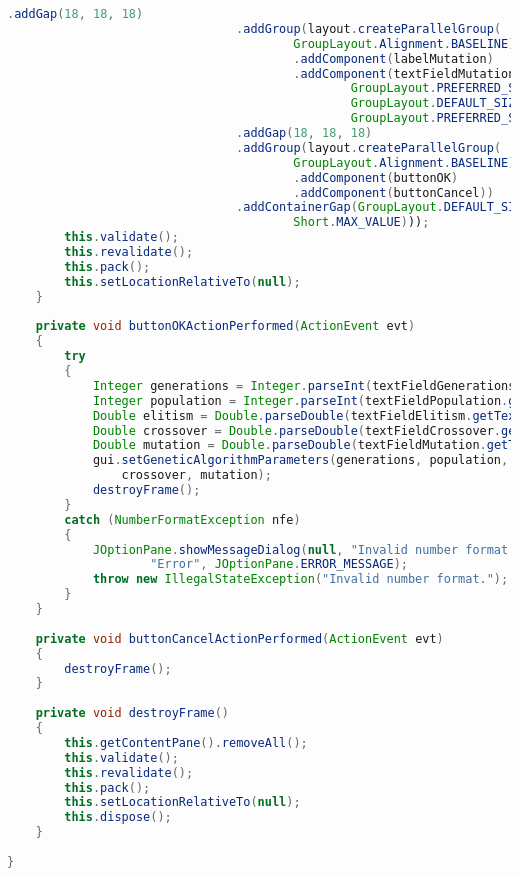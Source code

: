 \begin{lstlisting}[language=Java,basicstyle=\tiny,caption=GeneticParameters.java]
                                .addGap(18, 18, 18)
                                .addGroup(layout.createParallelGroup(
                                        GroupLayout.Alignment.BASELINE)
                                        .addComponent(labelMutation)
                                        .addComponent(textFieldMutation,
                                                GroupLayout.PREFERRED_SIZE,
                                                GroupLayout.DEFAULT_SIZE,
                                                GroupLayout.PREFERRED_SIZE))
                                .addGap(18, 18, 18)
                                .addGroup(layout.createParallelGroup(
                                        GroupLayout.Alignment.BASELINE)
                                        .addComponent(buttonOK)
                                        .addComponent(buttonCancel))
                                .addContainerGap(GroupLayout.DEFAULT_SIZE,
                                        Short.MAX_VALUE)));
        this.validate();
        this.revalidate();
        this.pack();
        this.setLocationRelativeTo(null);
    }
    
    private void buttonOKActionPerformed(ActionEvent evt)
    {
        try
        {
            Integer generations = Integer.parseInt(textFieldGenerations.getText());
            Integer population = Integer.parseInt(textFieldPopulation.getText());
            Double elitism = Double.parseDouble(textFieldElitism.getText());
            Double crossover = Double.parseDouble(textFieldCrossover.getText());
            Double mutation = Double.parseDouble(textFieldMutation.getText());
            gui.setGeneticAlgorithmParameters(generations, population, elitism, 
                crossover, mutation);
            destroyFrame();
        }
        catch (NumberFormatException nfe)
        {
            JOptionPane.showMessageDialog(null, "Invalid number format.",
                    "Error", JOptionPane.ERROR_MESSAGE);
            throw new IllegalStateException("Invalid number format.");
        }
    }
    
    private void buttonCancelActionPerformed(ActionEvent evt)
    {
        destroyFrame();
    }
    
    private void destroyFrame()
    {
        this.getContentPane().removeAll();
        this.validate();
        this.revalidate();
        this.pack();
        this.setLocationRelativeTo(null);
        this.dispose();
    }
    
}
\end{lstlisting}